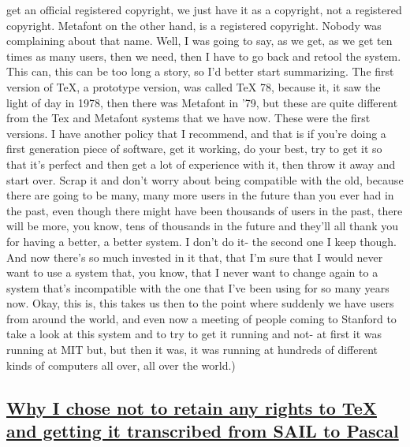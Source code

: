 \documentclass[]{article}
\begin{document}
get an official registered copyright, we just have it as a copyright,
not a registered copyright. Metafont on the other hand, is a registered
copyright. Nobody was complaining about that name. Well, I was going to
say, as we get, as we get ten times as many users, then we need, then I
have to go back and retool the system. This can, this can be too long a
story, so I'd better start summarizing. The first version of TeX, a
prototype version, was called TeX 78, because it, it saw the light of
day in 1978, then there was Metafont in '79, but these are quite
different from the Tex and Metafont systems that we have now. These were
the first versions. I have another policy that I recommend, and that is
if you're doing a first generation piece of software, get it working, do
your best, try to get it so that it's perfect and then get a lot of
experience with it, then throw it away and start over. Scrap it and
don't worry about being compatible with the old, because there are going
to be many, many more users in the future than you ever had in the past,
even though there might have been thousands of users in the past, there
will be more, you know, tens of thousands in the future and they'll all
thank you for having a better, a better system. I don't do it- the
second one I keep though. And now there's so much invested in it that,
that I'm sure that I would never want to use a system that, you know,
that I never want to change again to a system that's incompatible with
the one that I've been using for so many years now. Okay, this is, this
takes us then to the point where suddenly we have users from around the
world, and even now a meeting of people coming to Stanford to take a
look at this system and to try to get it running and not- at first it
was running at MIT but, but then it was, it was running at hundreds of
different kinds of computers all over, all over the world.)

\subsection{\texorpdfstring{\href{http://webofstories.com/play/17122}{Why
I chose not to retain any rights to TeX and getting it transcribed from
SAIL to
Pascal}}{Why I chose not to retain any rights to TeX and getting it transcribed from SAIL to Pascal}}\label{why-i-chose-not-to-retain-any-rights-to-tex-and-getting-it-transcribed-from-sail-to-pascal}
\end{document}
